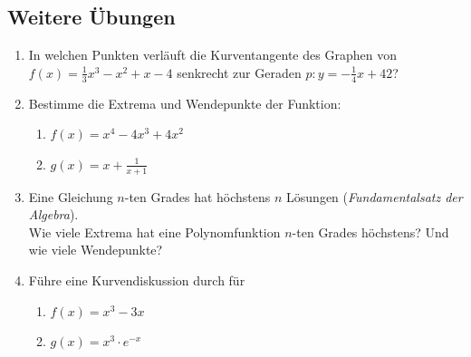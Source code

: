\clearpage
\subsection{Weitere Übungen}
\begin{enumerate}
    \item In welchen Punkten verläuft die Kurventangente des Graphen von $f(x) = \frac{1}{3} x^3-x^2+x-4$ senkrecht zur Geraden $p: y=-\frac{1}{4}x+42$?
    \item Bestimme die Extrema und Wendepunkte der Funktion:
          \begin{enumerate}
              \item $f(x) = x^4-4x^3+4x^2$
              \item $g(x) = x + \frac{1}{x+1}$
          \end{enumerate}
    \item Eine Gleichung $n$-ten Grades hat höchstens $n$ Lösungen (\emph{Fundamentalsatz der Algebra}). \\
          Wie viele Extrema hat eine Polynomfunktion $n$-ten Grades höchstens? Und wie viele Wendepunkte?
    \item Führe eine Kurvendiskussion durch für
          \begin{enumerate}
              \item $f(x) = x^3-3x$
              \item $g(x) = x^3\cdot e^{-x}$
          \end{enumerate}
\end{enumerate}

\clearpage
